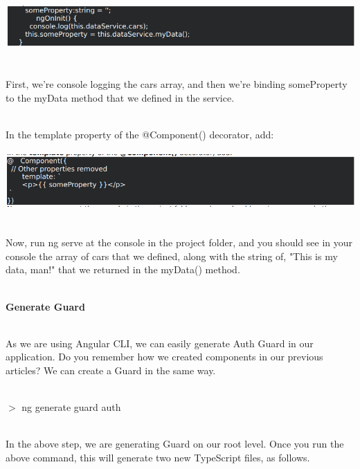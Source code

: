 \documentclass{article}
\begin{document}
\begin{center}
	\noindent \includegraphics*[width=6.26in, height=0.75in]{IMG-05-10}
\end{center}

\noindent \\ First, we're console logging the cars array, and then we're binding someProperty to the myData method that we defined in the service.

\noindent \\ In the template property of the @Component() decorator, add:

\begin{center}
	\noindent  \includegraphics*[width=6.24in, height=0.88in, trim=0.00in 0.00in 0.00in 0.05in]{IMG-05-11}
\end{center}

\noindent \\ Now, run ng serve at the console in the project folder, and you should see in your console the array of cars that we defined, along with the string of, "This is my data, man!" that we returned in  the myData() method.

\newpage
{}

\noindent 

\noindent \\ \textbf{Generate Guard}

\noindent \\ As we are using Angular CLI, we can easily generate Auth Guard in our application. Do you remember how we created components in our previous articles? We can create a Guard in the same way.

\noindent \\ $\mathrm{>}$ ng generate guard auth

\noindent 

\noindent \\ In the above step, we are generating Guard on our root level. Once you run the above command, this will generate two new TypeScript files, as follows.
\end{document}
